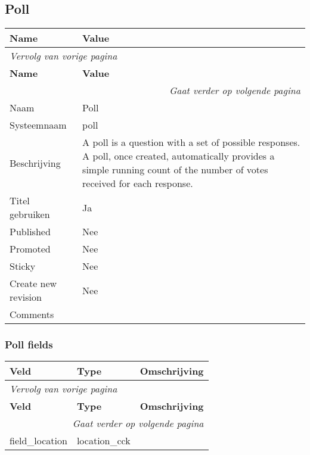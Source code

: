 \subsection{Poll}
\label{sec:content-poll}
  \begin{longtable}{| p{7.50cm}|p{7.50cm}|}
  \hline
  \rowcolor{tableheader}
  \textbf{Name} & \textbf{Value}  \tabularnewline
  \hline
\endfirsthead
\multicolumn{2}{l}{\textit{Vervolg van vorige pagina}} \\
\hline
\rowcolor{tableheader}
  \textbf{Name} & \textbf{Value}  \tabularnewline
  \hline
\hline
\endhead
\multicolumn{2}{r}{\textit{Gaat verder op volgende pagina}} \\
\endfoot
\hline
\endlastfoot
  Naam & Poll  \tabularnewline
  \hline
  Systeemnaam & poll  \tabularnewline
  \hline
  Beschrijving & A poll is a question with a set of possible responses. A poll, once created, automatically provides a simple running count of the number of votes received for each response.  \tabularnewline
  \hline
  Titel gebruiken & Ja  \tabularnewline
  \hline
  Published & Nee  \tabularnewline
  \hline
  Promoted & Nee  \tabularnewline
  \hline
  Sticky & Nee  \tabularnewline
  \hline
  Create new revision & Nee  \tabularnewline
  \hline
  Comments &   \tabularnewline
  \hline
  \end{longtable}

\subsubsection{Poll fields}
  \begin{longtable}{| p{5.00cm}|p{5.00cm}|p{5.00cm}|}
  \hline
  \rowcolor{tableheader}
  \textbf{Veld} & \textbf{Type} & \textbf{Omschrijving}  \tabularnewline
  \hline
\endfirsthead
\multicolumn{3}{l}{\textit{Vervolg van vorige pagina}} \\
\hline
\rowcolor{tableheader}
  \textbf{Veld} & \textbf{Type} & \textbf{Omschrijving}  \tabularnewline
  \hline
\hline
\endhead
\multicolumn{3}{r}{\textit{Gaat verder op volgende pagina}} \\
\endfoot
\hline
\endlastfoot
  field\_location & location\_cck &   \tabularnewline
  \hline
  \end{longtable}

